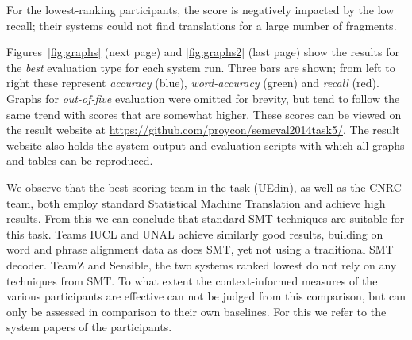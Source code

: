 For the lowest-ranking participants, the score is negatively impacted by the low recall; their systems could not find translations for a large number of fragments.

Figures~\ref{fig:graphs} (next page) and \ref{fig:graphs2} (last page) show the
results for the \emph{best} evaluation type for each system run. Three bars are
shown; from left to right these represent \emph{accuracy} (blue),
\emph{word-accuracy} (green) and \emph{recall} (red). Graphs for
\emph{out-of-five} evaluation were omitted for brevity, but tend to follow the
same trend with scores that are somewhat higher. These scores can be viewed on
the result website at \url{https://github.com/proycon/semeval2014task5/}. The
result website also holds the system output and evaluation scripts with which
all graphs and tables can be reproduced.

We observe that the best scoring team in the task (UEdin), as well as the CNRC
team, both employ standard Statistical Machine Translation and achieve high
results. From this we can conclude that standard SMT techniques are suitable
for this task. Teams IUCL and UNAL achieve similarly good results, building on
word and phrase alignment data as does SMT, yet not using a traditional SMT
decoder. TeamZ and Sensible, the two systems ranked lowest do not rely on any
techniques from SMT. To what extent the context-informed measures of the
various participants are effective can not be judged from this comparison, but
can only be assessed in comparison to their own baselines. For this we refer to
the system papers of the participants.



